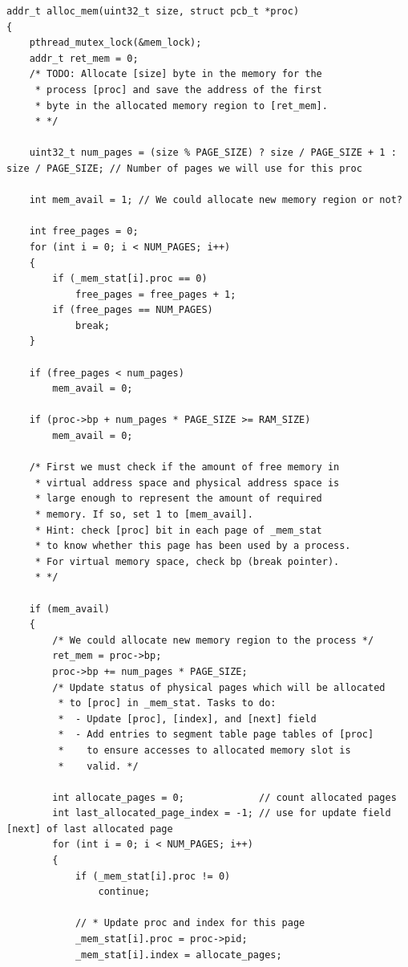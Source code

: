 \documentclass[a4paper]{article}
\numberwithin{equation}{section}
\begin{document}
\begin{mdframed}[leftline=false,rightline=false,backgroundcolor=blue!10,nobreak=false]
  \begin{verbatim}
addr_t alloc_mem(uint32_t size, struct pcb_t *proc)
{
    pthread_mutex_lock(&mem_lock);
    addr_t ret_mem = 0;
    /* TODO: Allocate [size] byte in the memory for the
	 * process [proc] and save the address of the first
	 * byte in the allocated memory region to [ret_mem].
	 * */

    uint32_t num_pages = (size % PAGE_SIZE) ? size / PAGE_SIZE + 1 : size / PAGE_SIZE; // Number of pages we will use for this proc

    int mem_avail = 1; // We could allocate new memory region or not?

    int free_pages = 0;
    for (int i = 0; i < NUM_PAGES; i++)
    {
        if (_mem_stat[i].proc == 0)
            free_pages = free_pages + 1;
        if (free_pages == NUM_PAGES)
            break;
    }

    if (free_pages < num_pages)
        mem_avail = 0;

    if (proc->bp + num_pages * PAGE_SIZE >= RAM_SIZE)
        mem_avail = 0;

    /* First we must check if the amount of free memory in
	 * virtual address space and physical address space is
	 * large enough to represent the amount of required 
	 * memory. If so, set 1 to [mem_avail].
	 * Hint: check [proc] bit in each page of _mem_stat
	 * to know whether this page has been used by a process.
	 * For virtual memory space, check bp (break pointer).
	 * */

    if (mem_avail)
    {
        /* We could allocate new memory region to the process */
        ret_mem = proc->bp;
        proc->bp += num_pages * PAGE_SIZE;
        /* Update status of physical pages which will be allocated
		 * to [proc] in _mem_stat. Tasks to do:
		 * 	- Update [proc], [index], and [next] field
		 * 	- Add entries to segment table page tables of [proc]
		 * 	  to ensure accesses to allocated memory slot is
		 * 	  valid. */

        int allocate_pages = 0;             // count allocated pages
        int last_allocated_page_index = -1; // use for update field [next] of last allocated page
        for (int i = 0; i < NUM_PAGES; i++)
        {
            if (_mem_stat[i].proc != 0)
                continue;

            // * Update proc and index for this page
            _mem_stat[i].proc = proc->pid;
            _mem_stat[i].index = allocate_pages;


\end{verbatim}
\end{mdframed}
\end{document}
